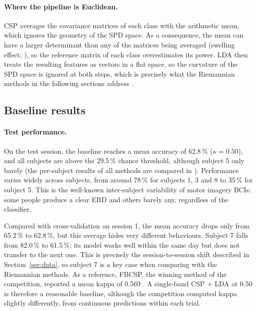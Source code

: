 \paragraph{Where the pipeline is Euclidean.}
CSP averages the covariance matrices of each class with the arithmetic mean, which ignores the geometry of the SPD space. As a consequence, the mean can have a larger determinant than any of the matrices being averaged (swelling effect; \citealp{arsigny2006}), so the reference matrix of each class overestimates its power. LDA then treats the resulting features as vectors in a flat space, so the curvature of the SPD space is ignored at both steps, which is precisely what the Riemannian methods in the following sections address \citep{barachant2012}.


\subsection{Baseline results}
\label{sec:baseline_results}

\paragraph{Test performance.}
On the test session, the baseline reaches a mean accuracy of 62.8\,\% ($\kappa = 0.50$), and all subjects are above the 29.5\,\% chance threshold, although subject 5 only barely (the per-subject results of all methods are compared in ). Performance varies widely across subjects, from around 78\,\% for subjects 1, 3 and 8 to 35\,\% for subject 5. This is the well-known inter-subject variability of motor imagery BCIs: some people produce a clear ERD and others barely any, regardless of the classifier.

Compared with cross-validation on session 1, the mean accuracy drops only from 65.2\,\% to 62.8\,\%, but this average hides very different behaviours. Subject 7 falls from 82.0\,\% to 61.5\,\%: its model works well within the same day but does not transfer to the next one. This is precisely the session-to-session shift described in Section~\ref{sec:data}, so subject 7 is a key case when comparing with the Riemannian methods. As a reference, FBCSP, the winning method of the competition, reported a mean kappa of 0.569 \citep{ang2012}. A single-band CSP + LDA at 0.50 is therefore a reasonable baseline, although the competition computed kappa slightly differently, from continuous predictions within each trial.

